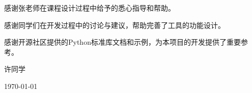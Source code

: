 
\vspace{2em}

感谢张老师在课程设计过程中给予的悉心指导和帮助。

感谢同学们在开发过程中的讨论与建议，帮助完善了工具的功能设计。

感谢开源社区提供的Python标准库文档和示例，为本项目的开发提供了重要参考。

\vspace{2em}

\begin{flushright}
    许同学
\end{flushright}

\begin{flushright}
    \today
\end{flushright}
